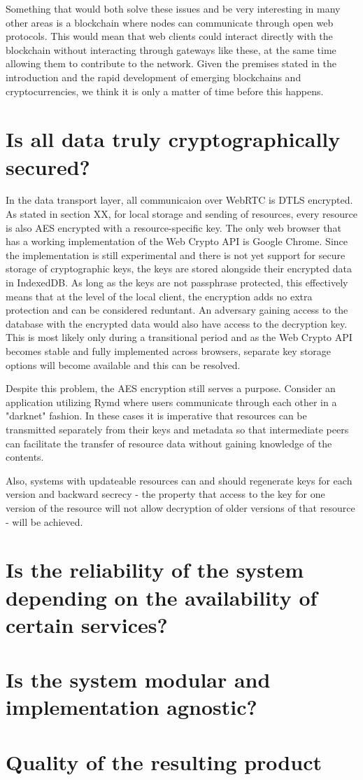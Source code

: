 Something that would both solve these issues and be very interesting in many other areas is a blockchain where nodes can communicate through open web protocols. This would mean that web clients could interact directly with the blockchain without interacting through gateways like these, at the same time allowing them to contribute to the network. Given the premises stated in the introduction and the rapid development of emerging blockchains and cryptocurrencies, we think it is only a matter of time before this happens.

\section{Is all data truly cryptographically secured?}
In the data transport layer, all communicaion over WebRTC is DTLS encrypted. As stated in section XX, for local storage and sending of resources, every resource is also AES encrypted with a resource-specific key. The only web browser that has a working implementation of the Web Crypto API is Google Chrome. Since the implementation is still experimental and there is not yet support for secure storage of cryptographic keys, the keys are stored alongside their encrypted data in IndexedDB. As long as the keys are not passphrase protected, this effectively means that at the level of the local client, the encryption adds no extra protection and can be considered reduntant. An adversary gaining access to the database with the encrypted data would also have access to the decryption key. This is most likely only during a transitional period and as the Web Crypto API becomes stable and fully implemented across browsers, separate key storage options will become available and this can be resolved.

Despite this problem, the AES encryption still serves a purpose. Consider an application utilizing Rymd where users communicate through each other in a "darknet" fashion. In these cases it is imperative that resources can be transmitted separately from their keys and metadata so that intermediate peers can facilitate the transfer of resource data without gaining knowledge of the contents.

Also, systems with updateable resources can and should regenerate keys for each version and backward secrecy - the property that access to the key for one version of the resource will not allow decryption of older versions of that resource - will be achieved.


\section{Is the reliability of the system depending on the availability of certain services?}
\section{Is the system modular and implementation agnostic?}

\section{Quality of the resulting product}


